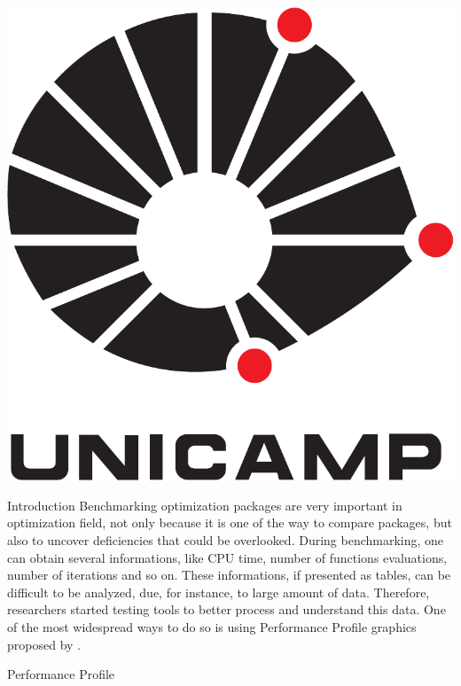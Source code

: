 \documentclass[paperwidth=90cm,paperheight=120cm,portrait]{baposter}
\begin{document}
\begin{poster}
{\begin{minipage}{16em}
        \includegraphics[height=0.06\textheight]{figures/logo-unicamp}
      \end{minipage}
 }

      
      \begin{posterbox}[name=intro,column=0,row=0,span=1]{Introduction}
        Benchmarking optimization packages are very important in optimization
        field, not only because it is one of the way to compare packages, but also
        to uncover deficiencies that could be overlooked. During benchmarking, one
        can obtain several informations, like CPU time, number of functions
        evaluations, number of iterations and so on. These informations, if
        presented as tables, can be difficult to be analyzed, due, for instance,
        to large amount of data. Therefore, researchers started testing tools to
        better process and understand this data.  One of the most widespread ways
        to do so is using Performance Profile graphics proposed by
        \textcite{Dolan2001}.
       \end{posterbox}

       \begin{posterbox}[name=perprof,below=intro]{Performance Profile}  


\end{posterbox}
\end{poster}
\end{document}
